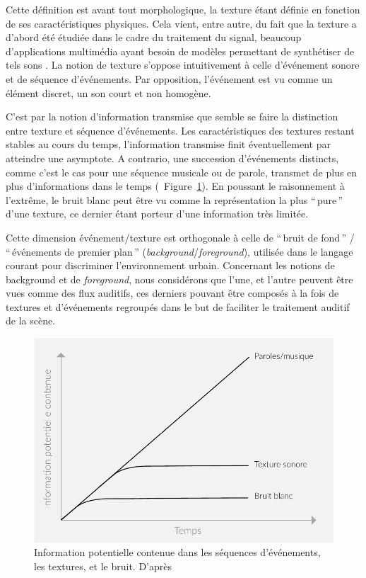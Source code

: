 Cette définition est avant tout morphologique, la texture étant définie en fonction de ses caractéristiques physiques. Cela vient, entre autre, du fait que la texture a d'abord été étudiée dans le cadre du traitement du signal, beaucoup d'applications multimédia ayant besoin de  modèles permettant de synthétiser de tels sons \citep{schwarz2011state}. La notion de texture s'oppose intuitivement à celle d'événement sonore et de séquence d'événements. Par opposition, l'événement est vu comme un élément discret, un son court et non homogène.

C'est par la notion d'information transmise que semble se faire la distinction entre texture et séquence d'événements. Les caractéristiques des textures restant stables au cours du temps, l'information transmise finit éventuellement par atteindre une asymptote. A contrario, une succession d'événements distincts, comme c'est le cas pour une séquence musicale ou de parole, transmet de plus en plus d'informations dans le temps (\cf~Figure~\ref{fig:texture}). En poussant le raisonnement à l’extrême, le bruit blanc peut être vu comme la représentation la plus ``\,pure\,'' d'une texture, ce dernier étant porteur d'une information très limitée.

Cette dimension événement/texture est orthogonale à celle de ``\,bruit de fond\,'' / ``\,événements de premier plan\,'' (\emph{background}/\emph{foreground}), utilisée dans le langage courant pour discriminer l’environnement urbain. Concernant les notions de background et de \emph{foreground}, nous considérons que l'une, et l'autre peuvent être vues comme des flux auditifs, ces derniers pouvant être composés à la fois de textures et d’événements regroupés dans le but de faciliter le traitement auditif de la scène.

\begin{figure}[t]
        \myfloatalign
        \includegraphics[width=.8\linewidth]{gfx/texture}
        \caption[Information potentielle contenue dans les séquences d'événements, les textures, et le bruit]{Information potentielle contenue dans les séquences d'événements, les textures, et le bruit. D'après \citep{saint1995classification}}\label{fig:texture}
\end{figure}


